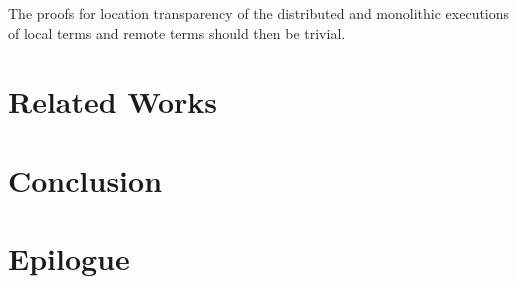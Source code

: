 The proofs for location transparency of the distributed and monolithic executions of local terms and remote terms should then be trivial.

\section{Related Works}
\label{chap3:related-works}

\section{Conclusion}
\label{chap3:conclusion}

\section{Epilogue}
\label{chap3:epilogue}